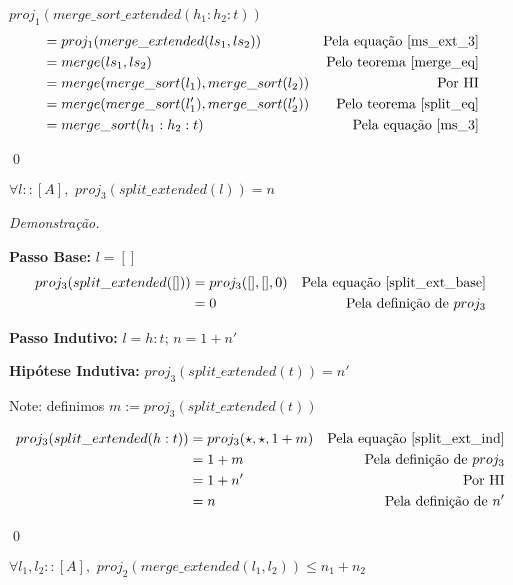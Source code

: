 \documentclass[12pt, oneside, a4paper,english,brazil]{abntex2}
\begin{document}
$proj_{1}(merge\_sort\_extended(h_{1} : h_{2} : t))$
\begin{align*}
  &= proj_{1}(merge\_extended(ls_{1}, ls_{2})) &\text{Pela equa\c{c}\~ao \ref{ms_ext_3}}\\
  &= merge(ls_{1}, ls_{2}) &\text{Pelo teorema \ref{merge_eq}}\\
  &= merge(merge\_sort(l_{1}), merge\_sort(l_{2})) &\text{Por HI}\\
  &= merge(merge\_sort(l'_{1}), merge\_sort(l'_{2})) &\text{Pelo teorema \ref{split_eq}}\\
  &= merge\_sort(h_{1} : h_{2} : t) &\text{Pela equa\c{c}\~ao \ref{ms_3}}
\end{align*}

\qed

\begin{teorema}\label{split_time}
  $\forall l :: [A], \,\, proj_{3}(split\_extended(l)) = n$
\end{teorema}

\noindent \textit{Demonstra\c{c}\~ao.}

\textbf{Passo Base: } $l = []$
\begin{align*}
  proj_{3}(split\_extended([])) &= proj_{3}([], [], 0) &\text{Pela equa\c{c}\~ao \ref{split_ext_base}} \\
  &= 0 &\text{Pela defini\c{c}\~ao de $proj_{3}$}
\end{align*}

\textbf{Passo Indutivo: } $l = h : t$; $n = 1 + n'$

\textbf{Hip\'otese Indutiva: } $proj_{3}(split\_extended(t)) = n'$

Note: definimos $m := proj_{3}(split\_extended(t))$

\begin{align*}
  proj_{3}(split\_extended(h : t)) &= proj_{3}(\star, \star, 1 + m) &\text{Pela equa\c{c}\~ao \ref{split_ext_ind}}\\
                                   &= 1 + m &\text{Pela defini\c{c}\~ao de $proj_{3}$}\\
                                   &= 1 + n' &\text{Por HI} \\
  &= n &\text{Pela defini\c{c}\~ao de $n'$}
\end{align*}


\qed

\begin{teorema} \label{merge_time}
  $\forall l_{1}, l_{2} :: [A], \,\, proj_{2}(merge\_extended(l_{1}, l_{2})) \le n_{1} + n_{2}$
\end{teorema}
\end{document}
